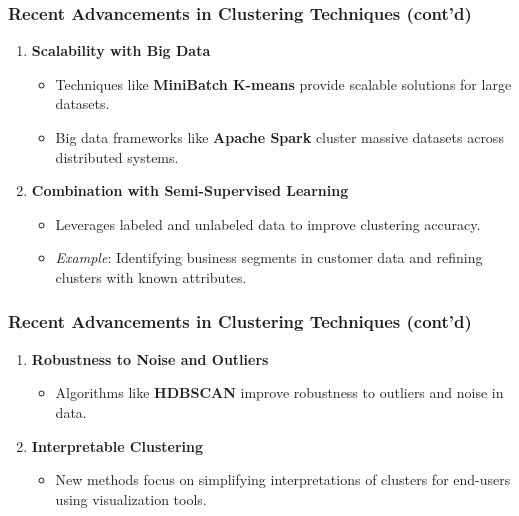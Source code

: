 \documentclass[aspectratio=169]{beamer}
\begin{document}
\begin{frame}[fragile]
    \frametitle{Recent Advancements in Clustering Techniques (cont'd)}
    \begin{enumerate}[resume]
        \item \textbf{Scalability with Big Data}
            \begin{itemize}
                \item Techniques like \textbf{MiniBatch K-means} provide scalable solutions for large datasets.
                \item Big data frameworks like \textbf{Apache Spark} cluster massive datasets across distributed systems.
            \end{itemize}

        \item \textbf{Combination with Semi-Supervised Learning}
            \begin{itemize}
                \item Leverages labeled and unlabeled data to improve clustering accuracy.
                \item \textit{Example}: Identifying business segments in customer data and refining clusters with known attributes.
            \end{itemize}
    \end{enumerate}
\end{frame}

\begin{frame}[fragile]
    \frametitle{Recent Advancements in Clustering Techniques (cont'd)}
    \begin{enumerate}[resume]
        \item \textbf{Robustness to Noise and Outliers}
            \begin{itemize}
                \item Algorithms like \textbf{HDBSCAN} improve robustness to outliers and noise in data.
            \end{itemize}

        \item \textbf{Interpretable Clustering}
            \begin{itemize}
                \item New methods focus on simplifying interpretations of clusters for end-users using visualization tools.
            \end{itemize}
    \end{enumerate}
\end{frame}
\end{document}
